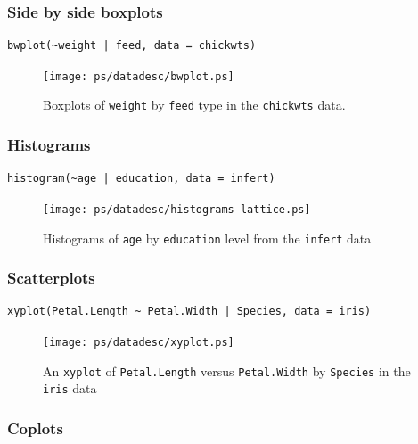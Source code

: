 \documentclass[10pt,english]{scrbook}
\begin{document}
\subsubsection[Side by side boxplots]{Side by side boxplots}
\label{sec-1-6-3-1}

\begin{verbatim}
bwplot(~weight | feed, data = chickwts)
\end{verbatim}

\begin{figure}[th]
  \texttt{[image: ps/datadesc/bwplot.ps]}
  \caption{Boxplots of \texttt{weight} by \texttt{feed} type in the \texttt{chickwts} data.}
  \label{fig-bwplot}
\end{figure}
\subsubsection[Histograms]{Histograms}
\label{sec-1-6-3-2}

\begin{verbatim}
histogram(~age | education, data = infert)
\end{verbatim}

\begin{figure}[th]
  \texttt{[image: ps/datadesc/histograms-lattice.ps]}
  \caption[Histograms of \texttt{age} by \texttt{education} level]{Histograms of \texttt{age} by \texttt{education} level from the \texttt{infert} data}
  \label{fig-histograms-lattice}
\end{figure}

\subsubsection[Scatterplots]{Scatterplots}
\label{sec-1-6-3-3}

\begin{verbatim}
xyplot(Petal.Length ~ Petal.Width | Species, data = iris)
\end{verbatim}

\begin{figure}[th]
  \texttt{[image: ps/datadesc/xyplot.ps]}
  \caption[An \texttt{xyplot} of \texttt{Petal.Length} versus \texttt{Petal.Width} by \texttt{Species}]{An \texttt{xyplot} of \texttt{Petal.Length} versus \texttt{Petal.Width} by \texttt{Species} in the \texttt{iris} data}
  \label{fig-xyplot}
\end{figure}
\subsubsection[Coplots]{Coplots}
\label{sec-1-6-3-4}
\end{document}
